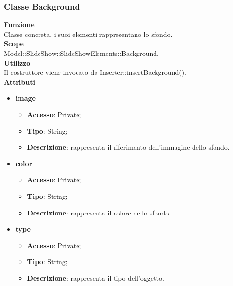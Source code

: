 {	\subsubsection{Classe Background}{
		\label{Background}
		\textbf{Funzione}\\
			\indent Classe concreta, i suoi elementi rappresentano lo sfondo.\\
	   	\textbf{Scope}\\
			\indent Model::SlideShow::SlideShowElements::Background.\\
		\textbf{Utilizzo}\\
			\indent Il costruttore viene invocato da Inserter::insertBackground().\\
		\textbf{Attributi}
		\begin{itemize}
			\item \textbf{image}
			\begin{itemize}
				\item \textbf{Accesso}: Private;
				\item \textbf{Tipo}: String;
				\item \textbf{Descrizione}: rappresenta il riferimento dell’immagine dello sfondo.
			\end{itemize}
			\item \textbf{color}
			\begin{itemize}
				\item \textbf{Accesso}: Private;
				\item \textbf{Tipo}: String;
				\item \textbf{Descrizione}: rappresenta il colore dello sfondo.
			\end{itemize}
			\item \textbf{type}
			\begin{itemize}
				\item \textbf{Accesso}: Private;
				\item \textbf{Tipo}: String;
				\item \textbf{Descrizione}: rappresenta il tipo dell'oggetto.
			\end{itemize}
		\end{itemize}

		}
	}
